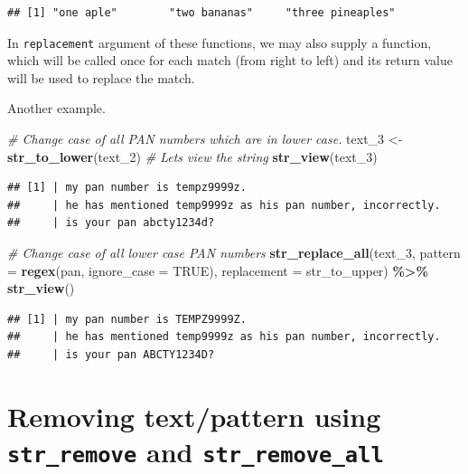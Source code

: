 \documentclass[
]{book}
\newenvironment{Shaded}{\begin{snugshade}}{\end{snugshade}}
\newcommand{\AttributeTok}[1]{\textcolor[rgb]{0.13,0.29,0.53}{#1}}
\newcommand{\CommentTok}[1]{\textcolor[rgb]{0.56,0.35,0.01}{\textit{#1}}}
\newcommand{\ConstantTok}[1]{\textcolor[rgb]{0.56,0.35,0.01}{#1}}
\newcommand{\FunctionTok}[1]{\textcolor[rgb]{0.13,0.29,0.53}{\textbf{#1}}}
\newcommand{\NormalTok}[1]{#1}
\newcommand{\OtherTok}[1]{\textcolor[rgb]{0.56,0.35,0.01}{#1}}
\newcommand{\SpecialCharTok}[1]{\textcolor[rgb]{0.81,0.36,0.00}{\textbf{#1}}}
\begin{document}
\begin{verbatim}
## [1] "one aple"        "two bananas"     "three pineaples"
\end{verbatim}

In \texttt{replacement} argument of these functions, we may also supply a function, which will be called once for each match (from right to left) and its return value will be used to replace the match.

Another example.

\begin{Shaded}
\begin{Highlighting}[]
\CommentTok{\# Change case of all PAN numbers which are in lower case.}
\NormalTok{text\_3 }\OtherTok{\textless{}{-}} \FunctionTok{str\_to\_lower}\NormalTok{(text\_2)}
\CommentTok{\# Let\textquotesingle{}s view the string}
\FunctionTok{str\_view}\NormalTok{(text\_3)}
\end{Highlighting}
\end{Shaded}

\begin{verbatim}
## [1] | my pan number is tempz9999z.
##     | he has mentioned temp9999z as his pan number, incorrectly.
##     | is your pan abcty1234d?
\end{verbatim}

\begin{Shaded}
\begin{Highlighting}[]
\CommentTok{\# Change case of all lower case PAN numbers}
\FunctionTok{str\_replace\_all}\NormalTok{(text\_3, }
                \AttributeTok{pattern =} \FunctionTok{regex}\NormalTok{(pan, }\AttributeTok{ignore\_case =} \ConstantTok{TRUE}\NormalTok{), }
                \AttributeTok{replacement =}\NormalTok{ str\_to\_upper) }\SpecialCharTok{\%\textgreater{}\%} 
  \FunctionTok{str\_view}\NormalTok{()}
\end{Highlighting}
\end{Shaded}

\begin{verbatim}
## [1] | my pan number is TEMPZ9999Z.
##     | he has mentioned temp9999z as his pan number, incorrectly.
##     | is your pan ABCTY1234D?
\end{verbatim}

\hypertarget{removing-textpattern-using-str_remove-and-str_remove_all}{%
\section{\texorpdfstring{Removing text/pattern using \texttt{str\_remove} and \texttt{str\_remove\_all}}{Removing text/pattern using str\_remove and str\_remove\_all}}\label{removing-textpattern-using-str_remove-and-str_remove_all}}
\end{document}
